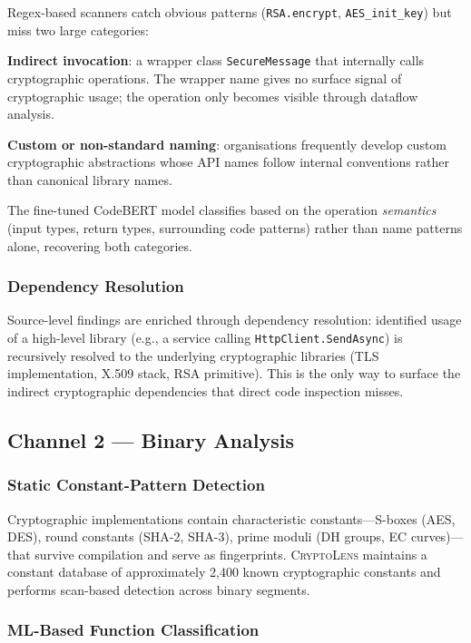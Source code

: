 \documentclass[sigconf,nonacm]{acmart}
\begin{document}
Regex-based scanners catch obvious patterns (\texttt{RSA.encrypt},
\texttt{AES\_init\_key}) but miss two large categories:

\textbf{Indirect invocation}: a wrapper class \texttt{SecureMessage}
that internally calls cryptographic operations. The wrapper name
gives no surface signal of cryptographic usage; the operation only
becomes visible through dataflow analysis.

\textbf{Custom or non-standard naming}: organisations frequently
develop custom cryptographic abstractions whose API names follow
internal conventions rather than canonical library names.

The fine-tuned CodeBERT model classifies based on the operation
\emph{semantics} (input types, return types, surrounding code
patterns) rather than name patterns alone, recovering both categories.

\subsubsection{Dependency Resolution}

Source-level findings are enriched through dependency resolution:
identified usage of a high-level library (e.g., a service calling
\texttt{HttpClient.SendAsync}) is recursively resolved to the
underlying cryptographic libraries (TLS implementation, X.509 stack,
RSA primitive). This is the only way to surface the indirect
cryptographic dependencies that direct code inspection misses.

\subsection{Channel 2 --- Binary Analysis}

\subsubsection{Static Constant-Pattern Detection}

Cryptographic implementations contain characteristic
constants---S-boxes (AES, DES), round constants (SHA-2, SHA-3),
prime moduli (DH groups, EC curves)---that survive compilation and
serve as fingerprints. \textsc{CryptoLens} maintains a constant
database of approximately 2{,}400 known cryptographic constants and
performs scan-based detection across binary segments.

\subsubsection{ML-Based Function Classification}
\end{document}
